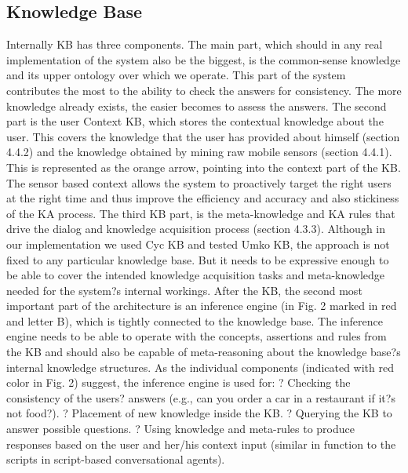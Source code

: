 \subsection{Knowledge Base}
Internally KB has three components. The main part, which should in any real implementation of the system also be the biggest, is the common-sense knowledge and its upper ontology over which we operate. This part of the system contributes the most to the ability to check the answers for consistency. The more knowledge already exists, the easier becomes to assess the answers. The second part is the user Context KB, which stores the contextual knowledge about the user. This covers the knowledge that the user has provided about himself (section 4.4.2) and the knowledge obtained by mining raw mobile sensors (section 4.4.1). This is represented as the orange arrow, pointing into the context part of the KB. The sensor based context allows the system to proactively target the right users at the right time and thus improve the efficiency and accuracy and also stickiness of the KA process.
The third KB part, is the meta-knowledge and KA rules that drive the dialog and knowledge acquisition process (section 4.3.3). Although in our implementation we used Cyc KB and tested Umko KB, the approach is not fixed to any particular knowledge base. But it needs to be expressive enough to be able to cover the intended knowledge acquisition tasks and meta-knowledge needed for the system?s internal workings. 
After the KB, the second most important part of the architecture is an inference engine (in Fig. 2 marked in red and letter B), which is tightly connected to the knowledge base.  The inference engine needs to be able to operate with the concepts, assertions and rules from the KB and should also be capable of meta-reasoning about the knowledge base?s internal knowledge structures. As the individual components (indicated with red color in Fig. 2) suggest, the inference engine is used for:
?	Checking the consistency of the users? answers (e.g., can you order a car in a restaurant if it?s not food?). 
?	Placement of new knowledge inside the KB.
?	Querying the KB to answer possible questions.
?	Using knowledge and meta-rules to produce responses based on the user and her/his context input (similar in function to the scripts in script-based conversational agents).

